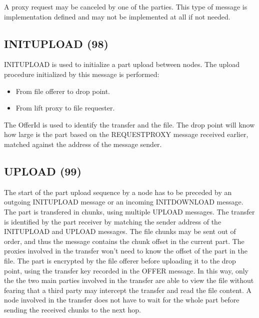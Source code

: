 A proxy request may be canceled by one of the parties. This type of message is
implementation defined and may not be implemented at all if not needed.

\subsection{INITUPLOAD (98)}

INITUPLOAD is used to initialize a part upload between nodes. The upload
procedure initialized by this message is performed:
\begin{itemize}
    \item From file offerer to drop point.
    \item From lift proxy to file requester.
\end{itemize}

The OfferId is used to identify the transfer and the file. The drop point will
know how large is the part based on the REQUESTPROXY message received earlier,
matched against the address of the message sender.

\begin{figure}[H]
    \centering
\end{figure}

\subsection{UPLOAD (99)}

The start of the part upload sequence by a node has to be preceded by an
outgoing INITUPLOAD message or an incoming INITDOWNLOAD message. The part is
transfered in chunks, using multiple UPLOAD messages. The transfer is
identified by the part receiver by matching the sender address of the
INITUPLOAD and UPLOAD messages. The file chunks may be sent out of order, and
thus the message contains the chunk offset in the current part. The proxies
involved in the transfer won't need to know the offset of the part in the file.
The part is encrypted by the file offerer before uploading it to the drop
point, using the transfer key recorded in the OFFER message. In this way, only
the the two main parties involved in the transfer are able to view the file
without fearing that a third party may intercept the transfer and read the file
content. A node involved in the transfer does not have to wait for the whole
part before sending the received chunks to the next hop.

